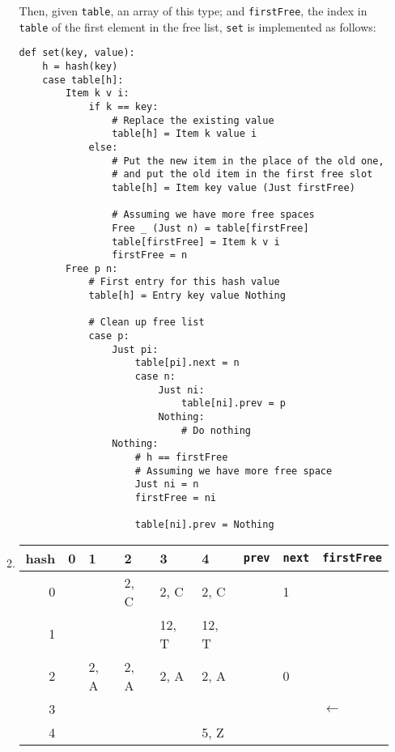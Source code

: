 \documentclass[11pt]{article}
\begin{document}
\begin{enumerate}
\begin{enumerate}
\begin{lstlisting}[language=haskell]
    \end{lstlisting}
    Then, given \texttt{table}, an array of this type; and \texttt{firstFree}, the index in \texttt{table} of the first element in the free list, \texttt{set} is implemented as follows:
    \begin{lstlisting}
def set(key, value):
    h = hash(key)
    case table[h]:
        Item k v i:
            if k == key:
                # Replace the existing value
                table[h] = Item k value i
            else:
                # Put the new item in the place of the old one,
                # and put the old item in the first free slot
                table[h] = Item key value (Just firstFree)

                # Assuming we have more free spaces
                Free _ (Just n) = table[firstFree]
                table[firstFree] = Item k v i
                firstFree = n
        Free p n:
            # First entry for this hash value
            table[h] = Entry key value Nothing

            # Clean up free list
            case p:
                Just pi:
                    table[pi].next = n
                    case n:
                        Just ni:
                            table[ni].prev = p
                        Nothing:
                            # Do nothing
                Nothing:
                    # h == firstFree
                    # Assuming we have more free space
                    Just ni = n
                    firstFree = ni

                    table[ni].prev = Nothing
    \end{lstlisting}
  \item
    \begin{tabular}[t]{r || l | l | l | l | l | l | l | l}
      hash & 0 & 1 & 2 & 3 & 4 & \texttt{prev} & \texttt{next} & \texttt{firstFree} \\
      \hline
      0 & &      & 2, C &  2, C &  2, C &   & 1 &                \\
      1 & &      &      & 12, T & 12, T &   &   &                \\
      2 & & 2, A & 2, A &  2, A &  2, A &   & 0 &                \\
      3 & &      &      &       &       &   &   & \(\leftarrow\) \\
      4 & &      &      &       &  5, Z &   &   &                \\
    \end{tabular}
  \end{enumerate}
\end{enumerate}
\end{document}
